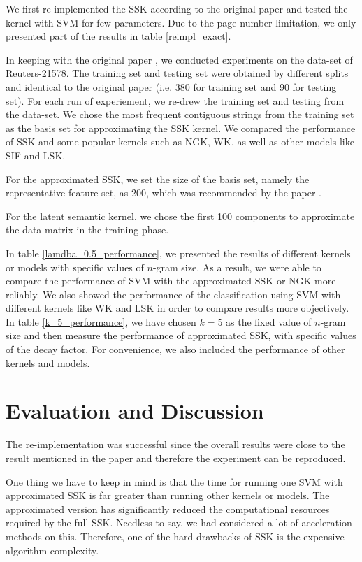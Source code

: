 \documentclass{article}
\begin{document}
We first re-implemented the SSK according to the original paper \cite{1} and tested the kernel with SVM for few parameters. Due to the page number limitation, we only presented part of the results in table \ref{reimpl_exact}.

In keeping with the original paper \cite{1}, we conducted experiments on the data-set of Reuters-21578. The training set and testing set were obtained by different splits and identical to the original paper (i.e. 380 for training set and 90 for testing set). For each run of experiement, we re-drew the training set and testing from the data-set. We chose the most frequent contiguous strings from the training set as the basis set for approximating the SSK kernel. We compared the performance of SSK and some popular kernels such as NGK, WK, as well as other models like SIF and LSK.

For the approximated SSK, we set the size of the basis set, namely the representative feature-set, as 200, which was recommended by the paper \cite{1}.

For the latent semantic kernel, we chose the first 100 components to approximate the data matrix in the training phase.

In table \ref{lamdba_0.5_performance}, we presented the results of different kernels or models with specific values of $n$-gram size. As a result, we were able to compare the performance of SVM with the approximated SSK or NGK more reliably. We also showed the performance of the classification using SVM with different kernels like WK and LSK in order to compare results more objectively. In table \ref{k_5_performance}, we have chosen $k=5$ as the fixed value of $n$-gram size and then measure the performance of approximated SSK, with specific values of the decay factor. For convenience, we also included the performance of other kernels and models.\\

\FloatBarrier
\section{Evaluation and Discussion}

The re-implementation was successful since the overall results were close to the result mentioned in the paper \cite{1} and therefore the experiment can be reproduced.

One thing we have to keep in mind is that the time for running one SVM with approximated SSK is far greater than running other kernels or models. The approximated version has significantly reduced the computational resources required by the full SSK. Needless to say, we had considered a lot of acceleration methods on this. Therefore, one of the hard drawbacks of SSK is the expensive algorithm complexity.
\end{document}
